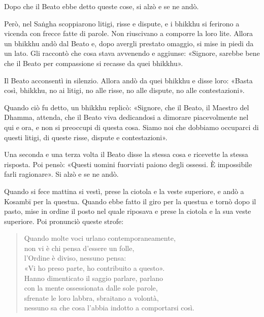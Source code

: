 Dopo che il Beato ebbe detto queste cose, si alzò e se ne andò.


 Però, nel Saṅgha scoppiarono litigi, risse e dispute, e i
bhikkhu si ferirono a vicenda con frecce fatte di parole. Non riuscivano a
comporre la loro lite. Allora un bhikkhu andò dal Beato e, dopo avergli prestato
omaggio, si mise in piedi da un lato. Gli raccontò che cosa stava avvenendo e
aggiunse: «Signore, sarebbe bene che il Beato per compassione si recasse da quei
bhikkhu».

Il Beato acconsentì in silenzio. Allora andò da quei bhikkhu e disse loro:
«Basta così, bhikkhu, no ai litigi, no alle risse, no alle dispute, no alle
contestazioni».

Quando ciò fu detto, un bhikkhu replicò: «Signore, che il Beato, il Maestro del
Dhamma, attenda, che il Beato viva dedicandosi a dimorare piacevolmente nel qui
e ora, e non si preoccupi di questa cosa. Siamo noi che dobbiamo occuparci di
questi litigi, di queste risse, dispute e contestazioni».

Una seconda e una terza volta il Beato disse la stessa cosa e ricevette la
stessa risposta. Poi pensò: «Questi uomini fuorviati paiono degli ossessi. È
impossibile farli ragionare». Si alzò e se ne andò.

Quando si fece mattina si vestì, prese la ciotola e la veste superiore, e andò a
Kosambī per la questua. Quando ebbe fatto il giro per la questua e tornò dopo il
pasto, mise in ordine il posto nel quale riposava e prese la ciotola e la sua
veste superiore. Poi pronunciò queste strofe:


\begin{quote}
Quando molte voci urlano contemporaneamente, \\
non vi è chi pensa d’essere un folle, \\
l’Ordine è diviso, nessuno pensa: \\
«Vi ho preso parte, ho contribuito a questo». \\
Hanno dimenticato il saggio parlare, parlano \\
con la mente ossessionata dalle sole parole, \\
sfrenate le loro labbra, sbraitano a volontà, \\
nessuno sa che cosa l’abbia indotto a comportarsi così.
\end{quote}

